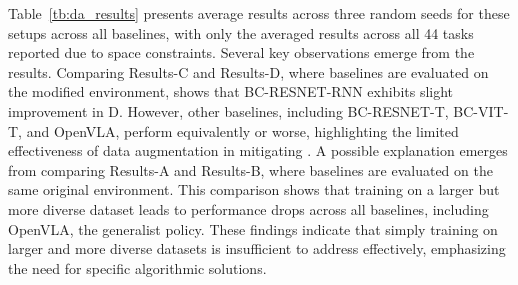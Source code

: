 Table~\ref{tb:da_results} presents average results across three random seeds for these setups across all baselines, with only the averaged results across all 44 tasks reported due to space constraints. Several key observations emerge from the results. Comparing Results-C and Results-D, where baselines are evaluated on the modified environment, shows that BC-RESNET-RNN exhibits slight improvement in D. However, other baselines, including BC-RESNET-T, BC-VIT-T, and OpenVLA, perform equivalently or worse, highlighting the limited effectiveness of data augmentation in mitigating \pb. A possible explanation emerges from comparing Results-A and Results-B, where baselines are evaluated on the same original environment. This comparison shows that training on a larger but more diverse dataset leads to performance drops across all baselines, including OpenVLA, the generalist policy. These findings indicate that simply training on larger and more diverse datasets is insufficient to address \pb effectively, emphasizing the need for specific algorithmic solutions.